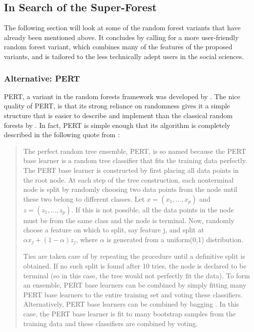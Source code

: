 \documentclass[a4paper,man,12pt,apacite,floatsintext,draftfirst]{apa6} %
\begin{document}
\subsection{In Search of the Super-Forest}
The following section will look at some of the random forest variants that
have already been mentioned above. It concludes by calling for a more
user-friendly random forest variant, which combines many of the features of
the proposed variants, and is tailored to the less technically adept users
in the social sciences.

\subsubsection{Alternative: PERT}
PERT, a variant in the random forests framework was developed
by \cite{cutler2001pert}.
The nice quality of PERT, is that its strong reliance on randomness gives
it a simple structure that is easier to describe and implement than the
classical random forests by \cite{breiman2001random}.
In fact, PERT is simple enough that its algorithm is completely described
in the following quote from \cite{cutler2001pert}:

\begin{quotation}
The perfect random tree ensemble, PERT, is so named because the PERT base
learner is a random tree classifier that fits the training data perfectly.
The PERT base learner is constructed by first placing all data points in
the root node.
At each step of the tree construction, each nonterminal node is split by
randomly choosing two data points from the node until these two belong to
different classes.
Let \( x = (x_{1} , . . . , x_{p} ) \) and \( z = (z_{1} , . . . , z_{p} ) \).
If this is not possible, all the data points in the node must be from the
same class and the node is terminal.
Now, randomly choose a feature on which to split, say feature j, and split
at \( \alpha x_{j} + (1 - \alpha) z_{j} \), where \( \alpha \) is generated
from a uniform(0,1) distribution.

Ties are taken care of by repeating the procedure until a definitive
split is obtained.
If no such split is found after 10 tries, the node is declared to be
terminal (so in this case, the tree would not perfectly fit the data).
To form an ensemble, PERT base learners can be combined by simply fitting
many PERT base learners to the entire training set and voting these
classifiers.
Alternatively, PERT base learners can be combined by bagging
\cite{breiman1996bagging}.
In this case, the PERT base learner is fit to many bootstrap samples
from the training data and these classifiers are combined by voting.
\end{quotation}
\end{document}
